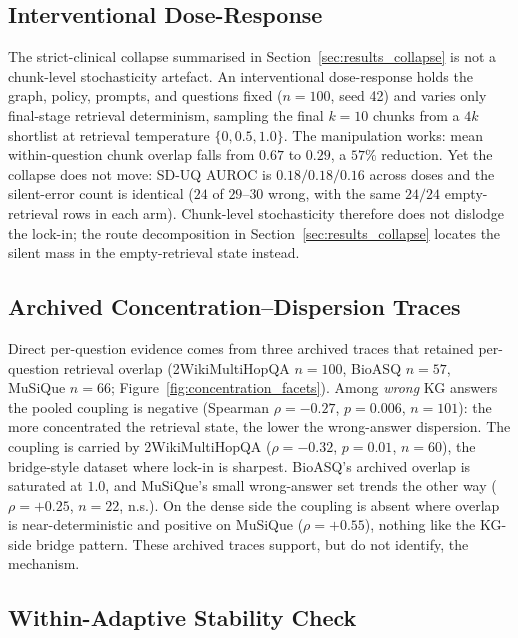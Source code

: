 \subsection{Interventional Dose-Response}
\label{sec:appendix_doseresponse}

The strict-clinical collapse summarised in
Section~\ref{sec:results_collapse} is not a chunk-level stochasticity
artefact.
An interventional dose-response holds the graph, policy, prompts, and
questions fixed ($n=100$, seed 42) and varies only final-stage retrieval
determinism, sampling the final $k{=}10$ chunks from a $4k$ shortlist at
retrieval temperature $\{0, 0.5, 1.0\}$.
The manipulation works: mean within-question chunk overlap falls from
$0.67$ to $0.29$, a $57\%$ reduction. Yet the collapse does not move: SD-UQ
AUROC is $0.18/0.18/0.16$ across doses and the silent-error count is identical
($24$ of $29$--$30$ wrong, with the same $24/24$ empty-retrieval rows in each
arm).
Chunk-level stochasticity therefore does not dislodge the lock-in; the route
decomposition in Section~\ref{sec:results_collapse} locates the silent mass in
the empty-retrieval state instead.

\subsection{Archived Concentration--Dispersion Traces}
\label{sec:appendix_concentration}

Direct per-question evidence comes from three archived traces that retained
per-question retrieval overlap
(2WikiMultiHopQA $n=100$, BioASQ $n=57$, MuSiQue $n=66$;
Figure~\ref{fig:concentration_facets}).
Among \emph{wrong} KG answers the pooled coupling is negative
(Spearman $\rho = -0.27$, $p = 0.006$, $n = 101$): the more concentrated the
retrieval state, the lower the wrong-answer dispersion.
The coupling is carried by 2WikiMultiHopQA ($\rho = -0.32$, $p = 0.01$,
$n = 60$), the bridge-style dataset where lock-in is sharpest.
BioASQ's archived overlap is saturated at $1.0$, and MuSiQue's small
wrong-answer set trends the other way ($\rho = +0.25$, $n = 22$, n.s.).
On the dense side the coupling is absent where overlap is near-deterministic
and positive on MuSiQue ($\rho = +0.55$), nothing like the KG-side bridge
pattern.
These archived traces support, but do not identify, the mechanism.

\subsection{Within-Adaptive Stability Check}
\label{sec:appendix_within_stability}

